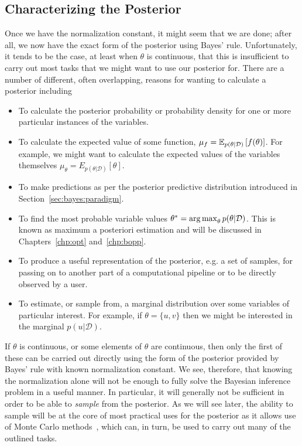 \subsection{Characterizing the Posterior}
\label{sec:inf:challenge:post}

Once we have the normalization constant, it might seem that we are done; after all,
we now have the exact form of the posterior using Bayes' rule.  Unfortunately, it tends to
be the case, at least when $\theta$ is continuous, that this is insufficient to carry out most
tasks that we might want to use our posterior for.  There are a number of different, often
overlapping, reasons for wanting to calculate a posterior including
\begin{itemize}
		\setlength\itemsep{0em}
	\item To calculate the posterior probability or probability density for one or more particular
	instances of the variables.
	\item To calculate the expected value of some function, $\mu_f = \mathbb{E}_{p(\theta|\mathcal{D})}\left[f(\theta)\right]$.
	For example, we might want to calculate the expected values of the variables themselves
	$\mu_\theta = E_{p(\theta|\mathcal{D})} \left[\theta\right]$.
	\item To make predictions as per the posterior predictive distribution introduced in Section~\ref{sec:bayes:paradigm}.
	\item To find the most probable variable values $\theta^* = \operatorname*{arg\,max}_{\theta} p(\theta|\mathcal{D})$.  
	This is known
	as maximum a posteriori estimation and will be discussed in Chapters~\ref{chp:opt} and~\ref{chp:bopp}.
	\item To produce a useful representation of the posterior, e.g. a set of samples,
	for passing on to another part of a computational pipeline or to be directly observed by a user.
	\item To estimate, or sample from, a marginal distribution over some variables of particular
	interest.  For example, if $\theta=\{u,v\}$ then we might be interested in the marginal
	$p(u|\mathcal{D})$.
\end{itemize}
If $\theta$ is continuous, or some elements of $\theta$ are continuous, then only the first of
these can be carried out directly using the form of the posterior provided by Bayes' rule
with known normalization constant.  We see, therefore, that knowing the normalization alone
will not be enough to fully solve the Bayesian inference problem in a useful manner.  In
particular, it will generally not be sufficient in order to be able to \emph{sample} from the
posterior.  As we will see later, the ability to sample will be at the core of most practical uses
for the posterior as it allows use of Monte Carlo
 methods~\citep{metropolis1949monte,robert2004monte,rubinstein2016simulation}, which
 can, in turn, be used to carry out many of the outlined tasks.

